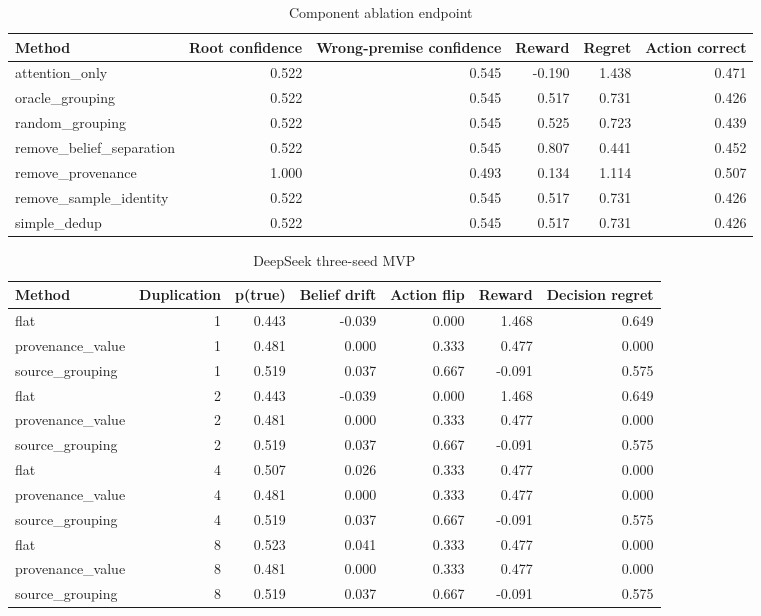 \documentclass[10pt]{article}
\begin{document}
\begin{table}[t]
\centering
\scriptsize
\begin{tabularx}{\linewidth}{Yrrrrr}
\toprule
Method & Root confidence & Wrong-premise confidence & Reward & Regret & Action correct \\
\midrule
attention\_only & 0.522 & 0.545 & -0.190 & 1.438 & 0.471 \\
oracle\_grouping & 0.522 & 0.545 & 0.517 & 0.731 & 0.426 \\
random\_grouping & 0.522 & 0.545 & 0.525 & 0.723 & 0.439 \\
remove\_belief\_separation & 0.522 & 0.545 & 0.807 & 0.441 & 0.452 \\
remove\_provenance & 1.000 & 0.493 & 0.134 & 1.114 & 0.507 \\
remove\_sample\_identity & 0.522 & 0.545 & 0.517 & 0.731 & 0.426 \\
simple\_dedup & 0.522 & 0.545 & 0.517 & 0.731 & 0.426 \\
\bottomrule
\end{tabularx}
\caption{Component ablation endpoint}
\end{table}
\begin{table}[t]
\centering
\scriptsize
\begin{tabularx}{\linewidth}{Yrrrrrr}
\toprule
Method & Duplication & p(true) & Belief drift & Action flip & Reward & Decision regret \\
\midrule
flat & 1 & 0.443 & -0.039 & 0.000 & 1.468 & 0.649 \\
provenance\_value & 1 & 0.481 & 0.000 & 0.333 & 0.477 & 0.000 \\
source\_grouping & 1 & 0.519 & 0.037 & 0.667 & -0.091 & 0.575 \\
flat & 2 & 0.443 & -0.039 & 0.000 & 1.468 & 0.649 \\
provenance\_value & 2 & 0.481 & 0.000 & 0.333 & 0.477 & 0.000 \\
source\_grouping & 2 & 0.519 & 0.037 & 0.667 & -0.091 & 0.575 \\
flat & 4 & 0.507 & 0.026 & 0.333 & 0.477 & 0.000 \\
provenance\_value & 4 & 0.481 & 0.000 & 0.333 & 0.477 & 0.000 \\
source\_grouping & 4 & 0.519 & 0.037 & 0.667 & -0.091 & 0.575 \\
flat & 8 & 0.523 & 0.041 & 0.333 & 0.477 & 0.000 \\
provenance\_value & 8 & 0.481 & 0.000 & 0.333 & 0.477 & 0.000 \\
source\_grouping & 8 & 0.519 & 0.037 & 0.667 & -0.091 & 0.575 \\
\bottomrule
\end{tabularx}
\caption{DeepSeek three-seed MVP}
\end{table}
\end{document}
